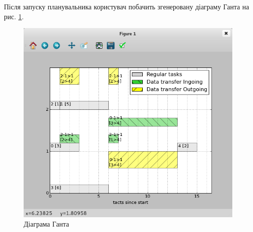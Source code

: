 Після запуску планувальника користувач побачить згенеровану діаграму Ганта на рис. \ref{fig:gantt}.

    \begin{figure}[h!]
      \begin{center}
        \includegraphics[width=\textwidth]{res/gantt.png}
      \end{center}
      \caption{Діаграма Ганта}
    \label{fig:gantt}
    \end{figure}
